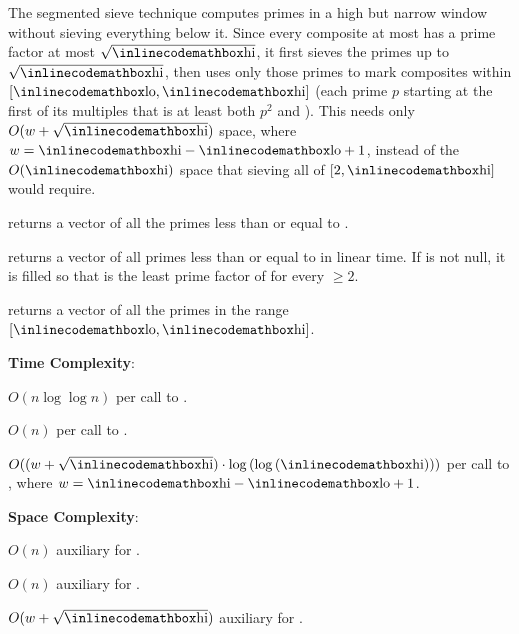 The segmented sieve technique computes primes in a high but narrow window without sieving everything below it. Since every composite at most  has a prime factor at most $\sqrt{{\inlinecodemath{hi}}}$, it first sieves the primes up to $\sqrt{{\inlinecodemath{hi}}}$, then uses only those primes to mark composites within $[{\inlinecodemath{lo}}, {\inlinecodemath{hi}}]$ (each prime $p$ starting at the first of its multiples that is at least both $p^2$ and ). This needs only $O(w + \sqrt{{\inlinecodemath{hi}}})$ space, where $w = {\inlinecodemath{hi}} - {\inlinecodemath{lo}} + 1$, instead of the $O({\inlinecodemath{hi}})$ space that sieving all of $[2, {\inlinecodemath{hi}}]$ would require.

\begin{compactitem}
  \item {} returns a vector of all the primes less than or equal to .
  \item {} returns a vector of all primes less than or equal to  in linear time. If  is not null, it is filled so that  is the least prime factor of  for every  $\geq 2$.
  \item {} returns a vector of all the primes in the range $[{\inlinecodemath{lo}}, {\inlinecodemath{hi}}]$.
\end{compactitem}

\textbf{Time Complexity}:
\begin{compactitem}
  \item $O(n \log \log n)$ per call to .
  \item $O(n)$ per call to .
  \item $O((w + \sqrt{{\inlinecodemath{hi}}}) \cdot \log\left(\log\left({\inlinecodemath{hi}}\right)\right))$ per call to , where $w = {\inlinecodemath{hi}} - {\inlinecodemath{lo}} + 1$.
\end{compactitem}

\textbf{Space Complexity}:
\begin{compactitem}
  \item $O(n)$ auxiliary for .
  \item $O(n)$ auxiliary for .
  \item $O(w + \sqrt{{\inlinecodemath{hi}}})$ auxiliary for .
\end{compactitem}

